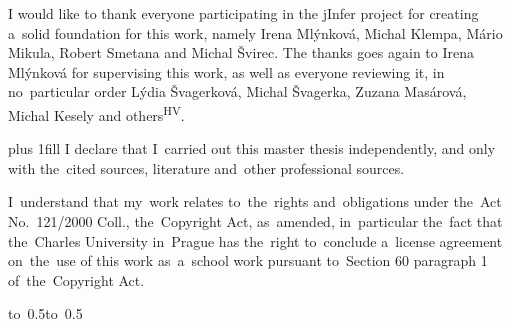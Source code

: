 \documentclass[a4paper,12pt,twoside,openright]{report}
\theoremstyle{definition}
\let\openright=\clearpage
\begin{document}
\newpage %
\openright

\cleardoublepage

\noindent
I would like to thank everyone participating in the jInfer project for creating a~solid foundation for this work, namely Irena Mlýn\-ko\-vá, Mi\-chal Klem\-pa, Má\-rio Mi\-ku\-la, Ro\-bert Sme\-ta\-na and Mi\-chal Švi\-rec. The thanks goes again to Irena Mlýn\-ko\-vá for supervising this work, as well as everyone reviewing it, in no~particular order Lý\-dia Šva\-ger\-ko\-vá, Mi\-chal Šva\-ger\-ka, Zu\-za\-na Ma\-sá\-ro\-vá, Mi\-chal Ke\-se\-ly and others\textsuperscript{HV}.

\newpage %
\vglue 0pt plus 1fill
\noindent
I declare that I~carried out this master thesis independently, and only with the~cited sources, literature and~other professional sources.

\medskip\noindent
I~understand that my~work relates to~the~rights and~obligations under the~Act No.~121/2000 Coll., the~Copyright Act, as~amended, in~particular the~fact that the~Charles University in~Prague has the~right to~conclude a~license agreement on~the~use of this work as~a~school work pursuant to~Section 60 paragraph 1 of~the~Copyright Act.

\vspace{10mm}

\hbox{\hbox to 0.5\hbox to 0.5\hsize{%

\hss}}

\vspace{20mm}
\end{document}
